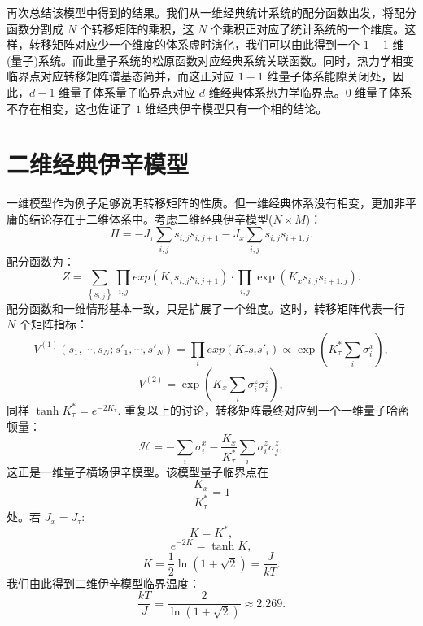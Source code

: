 \documentclass[UTF8]{ctexart}
\begin{document}
再次总结该模型中得到的结果。我们从一维经典统计系统的配分函数出发，将配分函数分割成 $N$ 个转移矩阵的乘积，这 $N$ 个乘积正对应了统计系统的一个维度。这样，转移矩阵对应少一个维度的体系虚时演化，我们可以由此得到一个
$1 - 1$ 维(量子)系统。而此量子系统的松原函数对应经典系统关联函数。同时，热力学相变临界点对应转移矩阵谱基态简并，而这正对应 $1 - 1$ 维量子体系能隙关闭处，因此，$d - 1$ 维量子体系量子临界点对应 $d$ 维经典体系热力学临界点。$0$ 维量子体系不存在相变，这也佐证了
$1$ 维经典伊辛模型只有一个相的结论。

\section*{二维经典伊辛模型}
\noindent
一维模型作为例子足够说明转移矩阵的性质。但一维经典体系没有相变，更加非平庸的结论存在于二维体系中。考虑二维经典伊辛模型($N\times M$)：
\begin{equation}
H=-J_{\tau}\sum_{i,j}s_{i,j}s_{i,j+1}-J_{x}\sum_{i,j}s_{i,j}s_{i+1,j}.
\end{equation}
配分函数为：
\begin{equation}
Z=\sum_{\left\{ s_{i,j}\right\} }\prod_{i,j}exp\left(K_{\tau}s_{i,j}s_{i,j+1}\right)\cdot\prod_{i,j}\exp\left(K_{x}s_{i,j}s_{i+1,j}\right).
\end{equation}
配分函数和一维情形基本一致，只是扩展了一个维度。这时，转移矩阵代表一行 $N$ 个矩阵指标：
\begin{equation}
V^{(1)}\left(s_{1},\cdots,s_{N};s'_{1},\cdots,s'_{N}\right)=\prod_{i}exp\left(K_{\tau}s_{i}s'_{i}\right)\propto\exp\left(K_{\tau}^{*}\sum_{i}\sigma_{i}^{x}\right),
\end{equation}
\begin{equation}
V^{(2)}=\exp\left(K_{x}\sum_{i}\sigma_{i}^{z}\sigma_{i}^{z}\right),
\end{equation}
同样 $\tanh K_{\tau}^{*}=e^{-2K_{\tau}}$. 重复以上的讨论，转移矩阵最终对应到一个一维量子哈密顿量：
\begin{equation}
\mathcal{H}=-\sum_{i}\sigma_{i}^{x}-\frac{K_{x}}{K_{\tau}^{*}}\sum_{i}\sigma_{i}^{z}\sigma_{j}^{z},
\end{equation}
这正是一维量子横场伊辛模型。该模型量子临界点在
\begin{equation}
\frac{K_{x}}{K_{\tau}^{*}}=1
\end{equation}
处。若 $J_{x}=J_{\tau}$:
\begin{equation}
K=K^{*},
\end{equation}
\begin{equation}
e^{-2K}=\tanh K,
\end{equation}
\begin{equation}
K=\frac{1}{2}\ln\left(1+\sqrt{2}\right)=\frac{J}{kT}.
\end{equation}
我们由此得到二维伊辛模型临界温度：
\begin{equation}
\frac{kT}{J}=\frac{2}{\ln\left(1+\sqrt{2}\right)}\approx2.269.
\end{equation}
\end{document}
